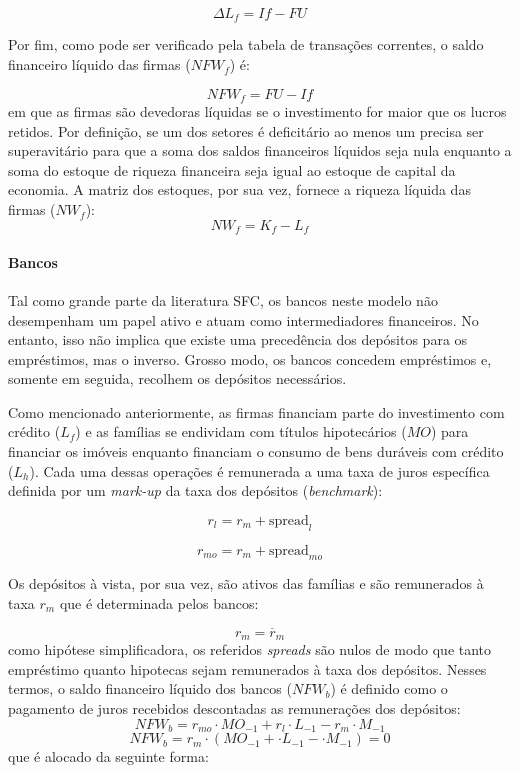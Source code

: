 \begin{equation}
    \Delta L_f = If - FU
\end{equation}

Por fim, como pode ser verificado pela tabela de transações correntes, o saldo financeiro líquido das firmas ($NFW_f$) é:

\begin{equation}
    NFW_f = FU - If
\end{equation}
em que as firmas são devedoras líquidas se o investimento for maior que os lucros retidos. Por definição, se um dos setores é deficitário ao menos um precisa ser superavitário para que a soma dos saldos financeiros líquidos seja nula enquanto a soma do estoque de riqueza financeira seja igual ao estoque de capital da economia. A matriz dos estoques, por sua vez, fornece a riqueza líquida das firmas ($NW_f$):
\begin{equation}
    NW_f = K_f - L_f
\end{equation}

\paragraph*{Bancos} Tal como grande parte da literatura SFC, os bancos neste modelo não desempenham um papel ativo e atuam como intermediadores financeiros. No entanto, isso não implica que existe uma precedência dos depósitos para os empréstimos, mas o inverso. Grosso modo, os bancos concedem empréstimos e, somente em seguida, recolhem os depósitos necessários. 

Como mencionado anteriormente, as firmas financiam parte do investimento com crédito ($L_f$) e as famílias se endividam com títulos hipotecários ($MO$) para financiar os imóveis enquanto financiam o consumo de bens duráveis com crédito ($L_h$). Cada uma dessas operações é remunerada a uma taxa de juros específica definida por um \textit{mark-up} da taxa dos depósitos (\textit{benchmark}):

\begin{equation}
    r_l = r_m + \text{spread}_l
\end{equation}

\begin{equation}
    r_{mo} = r_m + \text{spread}_{mo}
\end{equation}

Os depósitos à vista, por sua vez, são ativos das famílias e são remunerados à taxa $r_m$ que é determinada pelos bancos:

\begin{equation}
    r_m = \overline r_m
\end{equation}
como hipótese simplificadora, os referidos \textit{spreads} são nulos de modo que tanto empréstimo quanto hipotecas sejam remunerados à taxa dos depósitos. Nesses termos, o saldo financeiro líquido dos bancos ($NFW_b$) é definido como o pagamento de juros recebidos descontadas as remunerações dos depósitos:
\begin{equation}
    NFW_b = r_{mo}\cdot MO_{-1} + r_l\cdot L_{-1} - r_m\cdot M_{-1}
\end{equation}
$$
    NFW_b = r_{m}\cdot (MO_{-1} + \cdot L_{-1} - \cdot M_{-1}) = 0
$$
que é alocado da seguinte forma:

